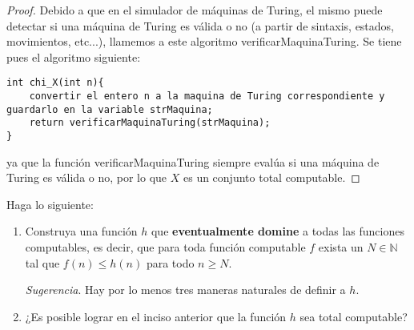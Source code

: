 \documentclass[12pt]{report}
\newcounter{it}
\theoremstyle{largebreak}
\begin{document}
    \begin{proof}
        Debido a que en el simulador de máquinas de Turing, el mismo puede detectar si una máquina de Turing es válida o no (a partir de sintaxis, estados, movimientos, etc...), llamemos a este algoritmo {\selectfont verificarMaquinaTuring}. Se tiene pues el algoritmo siguiente:

        \begin{lstlisting}
int chi_X(int n){
    convertir el entero n a la maquina de Turing correspondiente y guardarlo en la variable strMaquina;
    return verificarMaquinaTuring(strMaquina);
}
        \end{lstlisting}
        ya que la función {\selectfont verificarMaquinaTuring} siempre evalúa si una máquina de Turing es válida o no, por lo que $X$ es un conjunto total computable.
    \end{proof}

    \begin{excer}
        Haga lo siguiente:
        \begin{enumerate}[label = \textit{(\alph*)}]
            \item Construya una función $h$ que \textbf{eventualmente domine} a todas las funciones computables, es decir, que para toda función computable $f$ exista un $N\in\mathbb{N}$ tal que $f(n)\leq h(n)$ para todo $n\geq N$.
            
            \textit{Sugerencia}. Hay por lo menos tres maneras naturales de definir a $h$.
            \item ¿Es posible lograr en el inciso anterior que la función $h$ sea total computable?
        \end{enumerate}
    \end{excer}
\end{document}
